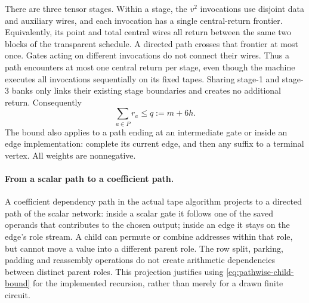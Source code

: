 There are three tensor stages. Within a stage, the $v^2$ invocations
use disjoint data and auxiliary wires, and each invocation has a single
central-return frontier. Equivalently, its point and total central wires
all return between the same two blocks of the transparent schedule.
A directed path crosses that frontier at most once. Gates acting on
different invocations do not connect their wires. Thus a path encounters
at most one central return per stage, even though the machine executes
all invocations sequentially on its fixed tapes. Sharing stage-1 and
stage-3 banks only links their existing stage boundaries and creates no
additional return. Consequently
\begin{equation}\label{eq:pathwise-child-bound}
 \sum_{a\in P}r_a\le q:=m+6h.
\end{equation}
The bound also applies to a path ending at an intermediate gate or inside
an edge implementation: complete its current edge, and then any suffix
to a terminal vertex. All weights are nonnegative.

\paragraph{From a scalar path to a coefficient path.}
A coefficient dependency path in the actual tape algorithm projects to
a directed path of the scalar network: inside a scalar gate it follows
one of the saved operands that contributes to the chosen output; inside
an edge it stays on the edge's role stream. A child can permute or combine
addresses within that role, but cannot move a value into a different
parent role. The row split, parking, padding and reassembly operations
do not create arithmetic dependencies between distinct parent roles.
This projection justifies using \eqref{eq:pathwise-child-bound} for the
implemented recursion, rather than merely for a drawn finite circuit.
